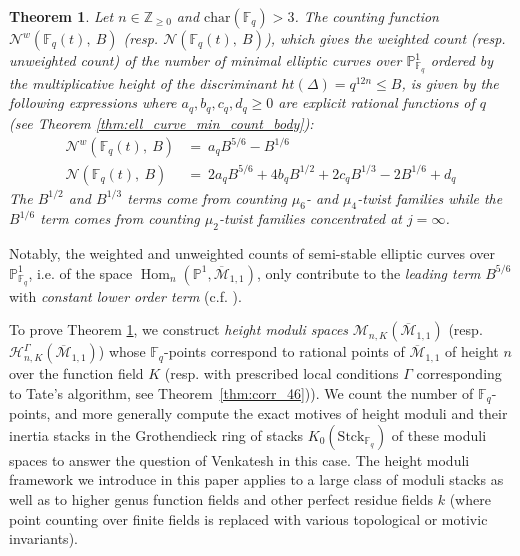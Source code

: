 \documentclass[a4paper,12pt]{amsart}
\newtheorem{thm}{Theorem}[section]
\theoremstyle{definition}
\newcommand{\cH}{\mathcal{H}}
\newcommand{\cM}{\mathcal{M}}
\newcommand{\Me}{\overline{\mathcal{M}}_{1,1}}
\newcommand{\Nc}{\mathcal{N}}
\newcommand{\Pb}{\mathbb{P}}
\newcommand{\Fb}{\mathbb{F}}
\DeclareMathOperator{\Hom}{Hom}
\begin{document}
	\begin{thm}\label{thm:ell_curve_min_count} 
		Let $n \in \mathbb{Z}_{\ge 0}$ and $\text{char} (\Fb_q) > 3$. The counting function $\Nc^w(\Fb_q(t),~B)$ (resp. $\Nc(\Fb_q(t), ~B)$), which gives the weighted count (resp. unweighted count) of the number of minimal elliptic curves over $\Pb^1_{\Fb_q}$ ordered by the multiplicative height of the discriminant $ht(\Delta) = q^{12n} \le B$, is given by the following expressions where $a_{q},b_{q},c_{q},d_{q} \ge 0$ are explicit rational functions of $q$ (see Theorem \ref{thm:ell_curve_min_count_body}):
		\begin{align*}
			\Nc^w(\Fb_q(t),~B) &= ~ a_{q}B^{5/6} - B^{1/6} \\
			\Nc(\Fb_q(t),~B) &= ~ 2a_{q} B^{5/6} + 4b_{q} B^{1/2} + 2c_{q} B^{1/3} - 2 B^{1/6} + d_{q}
		\end{align*}
		\noindent The $B^{1/2}$ and $B^{1/3}$ terms come from counting $\mu_6$- and $\mu_4$-twist families while the $B^{1/6}$ term comes from counting $\mu_2$-twist families concentrated at $j = \infty$. 
	\end{thm}
	
	Notably, the weighted and unweighted counts of semi-stable elliptic curves over $\Pb^1_{\Fb_q}$, i.e. of the space $\Hom_n(\mathbb{P}^1, \Me)$, only contribute to the \emph{leading term} $B^{5/6}$ with \emph{constant lower order term} (c.f. \cite{dJ2,HP,BPS}).
	
	\medskip
	
	To prove Theorem \ref{thm:ell_curve_min_count}, we construct \textit{height moduli spaces} $\cM_{n,K}(\Me)$ (resp. $\cH^\Gamma_{n,K}(\Me)$) whose $\Fb_q$-points correspond to rational points of $\Me$ of height $n$ over the function field $K$ (resp. with prescribed local conditions $\Gamma$ corresponding to Tate's algorithm, see Theorem~\ref{thm:corr_46})). We count the number of $\Fb_q$-points, and more generally compute the exact motives of height moduli and their inertia stacks in the Grothendieck ring of stacks $K_0(\mathrm{Stck}_{\Fb_q})$ of these moduli spaces to answer the question of Venkatesh in this case. The height moduli framework we introduce in this paper applies to a large class of moduli stacks as well as to higher genus function fields and other perfect residue fields $k$ (where point counting over finite fields is replaced with various topological or motivic invariants).
	
	
	\medskip
	
\end{document}
